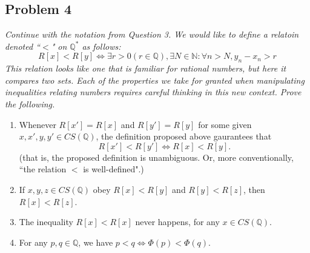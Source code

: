 \documentclass{article}
\newcommand{\N}{{\mathbb N}}
\newcommand{\Q}{{\mathbb Q}}
\begin{document}
\subsection*{Problem 4}
{\it Continue with the notation from Question 3.
	We would like to define a relatoin denoted ``$<$" on $\Q^*$ as follows:
	\[
		R[x] < R[y] \iff \exists r > 0 (r \in \Q), \exists N \in \N
		\colon \forall n > N, y_n - x_n > r
	\]
	This relation looks like one that is familiar for rational numbers,
	but here it compares two \emph{sets}.
	Each of the properties we take for granted when manipulating inequalities
	relating numbers requires careful thinking in this new context.
	Prove the following.
\begin{enumerate}
	\item Whenever $R[x'] = R[x]$ and $R[y'] = R[y]$
		for some given $x,x',y,y' \in CS(\Q)$,
		the definition proposed above gaurantees that
		\[
			R[x'] < R[y'] \iff R[x] < R[y].
		\]
		(that is, the proposed definition is unambiguous.
		Or, more conventionally,
		``the relation $<$ is well-defined".)
	\item If $x,y,z \in CS(\Q)$ obey $R[x] < R[y]$ and $R[y] < R[z]$,
		then $R[x] < R[z]$.
	\item The inequality $R[x] < R[x]$ never happens, for any $x \in CS(\Q)$.
	\item For any $p,q \in \Q$, we have $p<q \iff \Phi(p) < \Phi(q)$.
\end{enumerate}}
\end{document}
